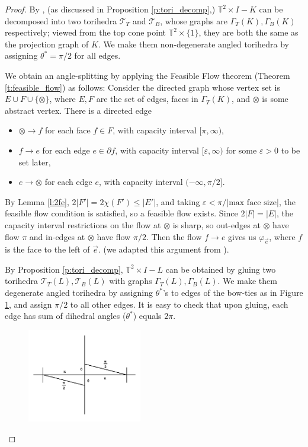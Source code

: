 \documentclass[11pt]{amsart}
\newcommand{\thmref}[1]{Theorem \ref{#1}}
\newcommand{\prpref}[1]{Proposition \ref{#1}}
\newcommand{\lemref}[1]{Lemma \ref{#1}}
\newcommand{\figref}[1]{Figure \ref{#1}}
\newcommand{\torus}{{\mathbb{T}^2}}
\newcommand{\sT}{{\mathcal{T}}}
\newcommand{\del}{\partial}
\newcommand{\vphi}{\varphi}
\newcommand{\veps}{\varepsilon}
\newcommand{\toruscomp}[1]{{\torus \times I - #1}}
\theoremstyle{plain}
\theoremstyle{definition}
\begin{document}
\begin{proof}
By \cite[Theorem 7.5]{CKP2},
(as discussed in \prpref{p:tori_decomp},)
$\toruscomp{K}$ can be decomposed
into two torihedra $\sT_T$ and $\sT_B$,
whose graphs are $\Gamma_T(K), \Gamma_B(K)$ respectively;
viewed from the top cone point $\torus \times \{1\}$,
they are both the same as the projection graph of $K$.
We make them non-degenerate angled torihedra by assigning $\theta^* = \pi/2$
for all edges.

We obtain an angle-splitting by applying the
Feasible Flow theorem (\thmref{t:feasible_flow}) as follows:
Consider the directed graph whose vertex set is
$E \cup F \cup \{\otimes\}$,
where $E, F$ are the set of edges, faces in $\Gamma_T(K)$,
and $\otimes$ is some abstract vertex.
There is a directed edge
\begin{itemize}
\item $\otimes \to f$ for each face $f\in F$, with capacity interval
	$[\pi, \infty)$,
\item $f \to e$ for each edge $e \in \del f$,
	with capacity interval $[\veps, \infty)$
	for some $\veps>0$ to be set later,
\item $e \to \otimes$ for each edge $e$, with capacity interval
	$(-\infty, \pi/2]$.
\end{itemize}
By \lemref{l:2fe}, $2|F'| = 2\chi(F') \leq |E'|$,
and taking $\veps < \pi / |\text{max face size}|$,
the feasible flow condition is satisfied,
so a feasible flow exists.
Since $2|F| = |E|$, the capacity interval restrictions
on the flow at $\otimes$ is sharp, so out-edges at $\otimes$
have flow $\pi$ and in-edges at $\otimes$ have flow $\pi/2$.
Then the flow $f \to e$ gives us $\vphi_{\vec{e}}$,
where $f$ is the face to the left of $\vec{e}$.
(we adapted this argument from \cite{BandS}).


By \prpref{p:tori_decomp}, $\toruscomp{L}$ can be
obtained by gluing two torihedra $\sT_T(L),\sT_B(L)$
with graphs $\Gamma_T(L),\Gamma_B(L)$.
We make them degenerate angled torihedra by assigning $\theta^*$'s
to edges of the bow-ties as in \figref{f:bowtie_angles},
and assign $\pi/2$ to all other edges.
It is easy to check that upon gluing,
each edge has sum of dihedral angles ($\theta^*$) equals $2\pi$.


\begin{figure}
\label{f:bowtie_angles}
\includegraphics[width=5cm]{more_pictures/horizontal_bowtie.png}
\end{figure}



\end{proof}
\end{document}
